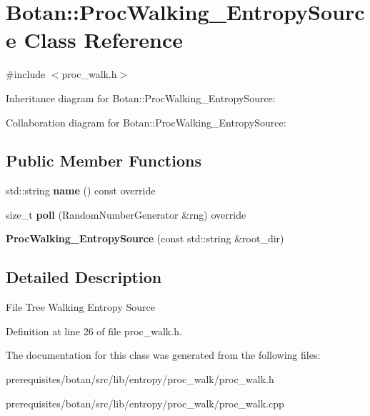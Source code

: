 \hypertarget{class_botan_1_1_proc_walking___entropy_source}{}\section{Botan\+:\+:Proc\+Walking\+\_\+\+Entropy\+Source Class Reference}
\label{class_botan_1_1_proc_walking___entropy_source}


{\ttfamily \#include $<$proc\+\_\+walk.\+h$>$}



Inheritance diagram for Botan\+:\+:Proc\+Walking\+\_\+\+Entropy\+Source\+:


Collaboration diagram for Botan\+:\+:Proc\+Walking\+\_\+\+Entropy\+Source\+:
\subsection*{Public Member Functions}
\begin{DoxyCompactItemize}
\item 
\mbox{\label{class_botan_1_1_proc_walking___entropy_source_a9ba281d68a5845b3b19e95c806df087f}} 
std\+::string {\bfseries name} () const override
\item 
\mbox{\label{class_botan_1_1_proc_walking___entropy_source_a02cb4b9656a64e0bc9fd5a75f45b372d}} 
size\+\_\+t {\bfseries poll} (Random\+Number\+Generator \&rng) override
\item 
\mbox{\label{class_botan_1_1_proc_walking___entropy_source_ab414c18284ec2f44841dac61a7ae0806}} 
{\bfseries Proc\+Walking\+\_\+\+Entropy\+Source} (const std\+::string \&root\+\_\+dir)
\end{DoxyCompactItemize}


\subsection{Detailed Description}
File Tree Walking Entropy Source 

Definition at line 26 of file proc\+\_\+walk.\+h.



The documentation for this class was generated from the following files\+:\begin{DoxyCompactItemize}
\item 
prerequisites/botan/src/lib/entropy/proc\+\_\+walk/proc\+\_\+walk.\+h\item 
prerequisites/botan/src/lib/entropy/proc\+\_\+walk/proc\+\_\+walk.\+cpp\end{DoxyCompactItemize}
